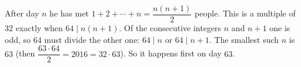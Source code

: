 After day $n$ he has met $1+2+\cdots+n=\dfrac{n(n+1)}{2}$ people. This is a multiple of $32$ exactly when $64\mid n(n+1)$. Of the consecutive integers $n$ and $n+1$ one is odd, so $64$ must divide the other one: $64\mid n$ or $64\mid n+1$. The smallest such $n$ is $63$ (then $\dfrac{63\cdot64}{2}=2016=32\cdot63$). So it happens first on day $\boxed{63}$.
